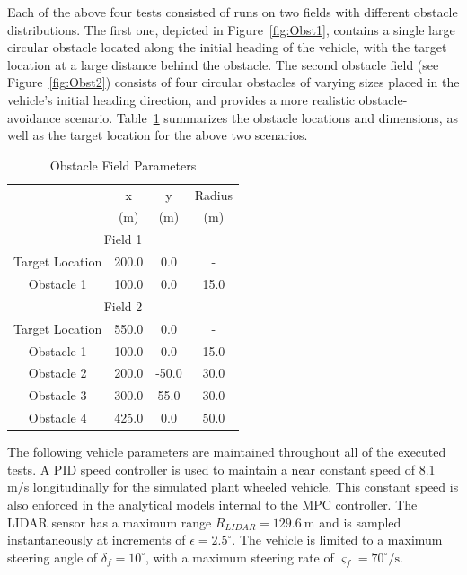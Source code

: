 \documentclass[12pt,onecolumn]{report}
\newcommand{\CHRONO}{{\sffamily{{Chrono}}}}
\begin{document}
Each of the above four tests consisted of runs on two fields with different obstacle distributions. 
The first one, depicted in Figure~\ref{fig:Obst1}, contains a single large circular obstacle located along the initial heading of the vehicle, with the target location at a large distance behind the obstacle. 
The second obstacle field (see Figure~\ref{fig:Obst2}) consists of four circular obstacles of varying sizes placed in the vehicle's initial heading direction, and provides a more realistic obstacle-avoidance scenario.
Table~\ref{t:ObstSummary} summarizes the obstacle locations and dimensions, as well as the target location for the above two scenarios.

\begin{table}
	\begin{center}
		\begin{tabular}{||c|c|c|c||} 
			
			\hline
			& x & y & Radius\\
			& (m) & (m) & (m)\\
			\hline\hline
			\multicolumn{4}{||c||}{Field 1} \\
			\hline
			Target Location  & 200.0 & 0.0 & -\\ 
			\hline
			Obstacle 1 & 100.0 & 0.0 & 15.0\\			
			\hline\hline
			\multicolumn{4}{||c||}{Field 2} \\
			\hline
			Target Location  & 550.0 & 0.0 & -\\ 
			\hline
			Obstacle 1 & 100.0 & 0.0 & 15.0\\
			\hline
			Obstacle 2 & 200.0 & -50.0 & 30.0\\
			\hline
			Obstacle 3 & 300.0 & 55.0 & 30.0\\
			\hline
			Obstacle 4 & 425.0 & 0.0 & 50.0\\
			\hline
		\end{tabular}
	\end{center}
	\caption{Obstacle Field Parameters}
	\label{t:ObstSummary}
\end{table}

The following vehicle parameters are maintained throughout all of the executed tests. A PID speed controller is used to maintain a near constant speed of 8.1 m/s longitudinally for the simulated plant {\CHRONO} wheeled vehicle. This constant speed is also enforced in the analytical models internal to the MPC controller. The LIDAR sensor has a maximum range $R_{LIDAR} = 129.6~\text{m}$ and is sampled instantaneously at increments of $\epsilon = 2.5^\circ$. The vehicle is limited to a maximum steering angle of $\delta_f = 10^\circ$, with a maximum steering rate of $\varsigma_f = 70^{\circ}/\text{s}$. 
\end{document}
